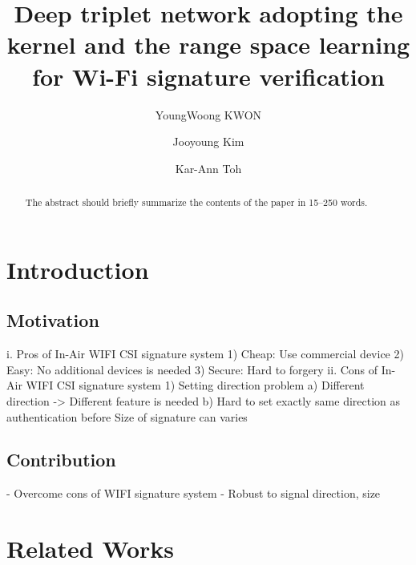 \documentclass[runningheads]{llncs}
\begin{document}
%
\title{Deep triplet network adopting the kernel and the range space learning for Wi-Fi signature verification}
%
%
\author{YoungWoong KWON \and
Jooyoung Kim  \and
Kar-Ann Toh}
%
%
%
\maketitle              %
%
\begin{abstract}
The abstract should briefly summarize the contents of the paper in
15--250 words.

\end{abstract}
%
%
%
\section{Introduction}

\subsection{Motivation}
i. Pros of In-Air WIFI CSI signature system
1) Cheap: Use commercial device
2) Easy: No additional devices is needed
3) Secure: Hard to forgery
ii. Cons of In-Air WIFI CSI signature system
1) Setting direction problem
a) Different direction -> Different feature is needed
b) Hard to set exactly same direction as authentication before
Size of signature can varies

\subsection{Contribution}
- Overcome cons of WIFI signature system
- Robust to signal direction, size

\section{Related Works}
\end{document}
